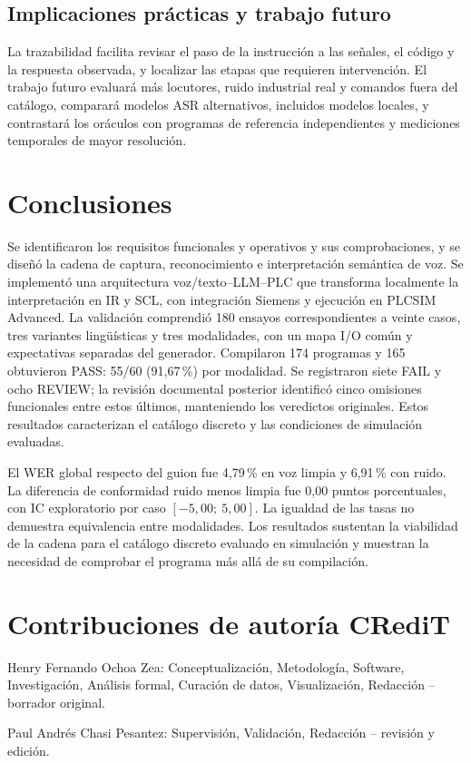 \documentclass[a4paper,fleqn]{cas-dc}
\newcommand{\TituloConclusiones}{Conclusiones}
\newcommand{\TituloConclusiones}{Conclusions}
\begin{document}
\subsection{Implicaciones prácticas y trabajo futuro}
La trazabilidad facilita revisar el paso de la instrucción a las señales, el código y la respuesta observada, y localizar las etapas que requieren intervención. El trabajo futuro evaluará más locutores, ruido industrial real y comandos fuera del catálogo, comparará modelos ASR alternativos, incluidos modelos locales, y contrastará los oráculos con programas de referencia independientes y mediciones temporales de mayor resolución.


\clearpage
\section{\TituloConclusiones}
\label{sec:conclusiones}
Se identificaron los requisitos funcionales y operativos y sus comprobaciones, y se diseñó la cadena de captura, reconocimiento e interpretación semántica de voz. Se implementó una arquitectura voz/texto--LLM--PLC que transforma localmente la interpretación en IR y SCL, con integración Siemens y ejecución en PLCSIM Advanced. La validación comprendió 180 ensayos correspondientes a veinte casos, tres variantes lingüísticas y tres modalidades, con un mapa I/O común y expectativas separadas del generador. Compilaron 174 programas y 165 obtuvieron PASS: 55/60 (91,67\,\%) por modalidad. Se registraron siete FAIL y ocho REVIEW; la revisión documental posterior identificó cinco omisiones funcionales entre estos últimos, manteniendo los veredictos originales. Estos resultados caracterizan el catálogo discreto y las condiciones de simulación evaluadas.

El WER global respecto del guion fue 4,79\,\% en voz limpia y 6,91\,\% con ruido. La diferencia de conformidad ruido menos limpia fue 0,00 puntos porcentuales, con IC exploratorio por caso $[-5,00;\ 5,00]$. La igualdad de las tasas no demuestra equivalencia entre modalidades. Los resultados sustentan la viabilidad de la cadena para el catálogo discreto evaluado en simulación y muestran la necesidad de comprobar el programa más allá de su compilación.
\ifdefined\FloatBarrier\FloatBarrier\fi


\section*{Contribuciones de autoría CRediT}
Henry Fernando Ochoa Zea: Conceptualización, Metodología, Software, Investigación, Análisis formal, Curación de datos, Visualización, Redacción -- borrador original.\par
Paul Andrés Chasi Pesantez: Supervisión, Validación, Redacción -- revisión y edición.\par
\end{document}
